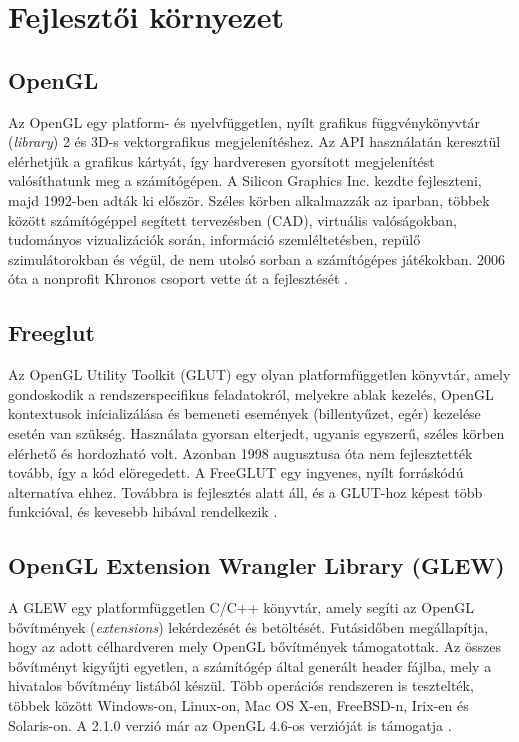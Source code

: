 

\section{Fejlesztői környezet}

\subsection{OpenGL}


Az OpenGL egy platform- és nyelvfüggetlen, nyílt grafikus függvénykönyvtár (\textit{library}) 2 és 3D-s vektorgrafikus megjelenítéshez. Az API használatán keresztül elérhetjük a grafikus kártyát, így hardveresen gyorsított megjelenítést valósíthatunk meg a számítógépen. A Silicon Graphics Inc. kezdte fejleszteni, majd 1992-ben adták ki először. Széles körben alkalmazzák az iparban, többek között számítógéppel segített tervezésben (CAD), virtuális valóságokban, tudományos vizualizációk során, információ szemléltetésben, repülő szimulátorokban és végül, de nem utolsó sorban a számítógépes játékokban. 2006 óta a nonprofit Khronos csoport vette át a fejlesztését \cite{wikiOGL}.

\subsection{Freeglut}

Az OpenGL Utility Toolkit (GLUT) egy olyan platformfüggetlen könyvtár, amely gondoskodik a rendszerspecifikus feladatokról, melyekre ablak kezelés, OpenGL kontextusok inícializálása és bemeneti események (billentyűzet, egér) kezelése esetén van szükség. Használata gyorsan elterjedt, ugyanis egyszerű, széles körben elérhető és hordozható volt. Azonban 1998 augusztusa óta nem fejlesztették tovább, így a kód elöregedett. A FreeGLUT egy ingyenes, nyílt forráskódú alternatíva ehhez. Továbbra is fejlesztés alatt áll, és a GLUT-hoz képest több funkcióval, és kevesebb hibával rendelkezik \cite{freeGlut}.

\subsection{OpenGL Extension Wrangler Library (GLEW)}

A GLEW egy platformfüggetlen C/C++ könyvtár, amely segíti az OpenGL bővítmények (\textit{extensions}) lekérdezését és betöltését. Futásidőben megállapítja, hogy az adott célhardveren mely OpenGL bővítmények támogatottak. Az összes bővítményt kigyűjti egyetlen, a számítógép által generált header fájlba, mely a hivatalos bővítmény listából készül. Több operációs rendszeren is tesztelték, többek között Windows-on, Linux-on, Mac OS X-en, FreeBSD-n, Irix-en és Solaris-on. A 2.1.0 verzió már az OpenGL 4.6-os verzióját is támogatja \cite{glew}.

